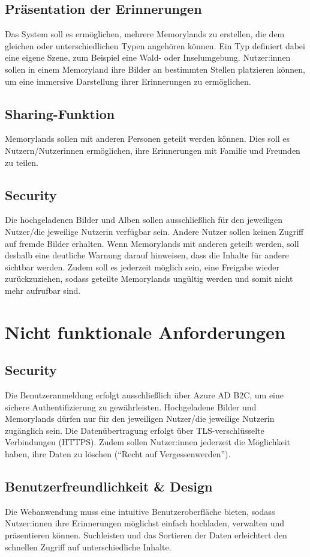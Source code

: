 \subsection{Präsentation der Erinnerungen}

Das System soll es ermöglichen, mehrere Memorylands zu erstellen, die dem 
gleichen oder unterschiedlichen Typen angehören können. Ein Typ definiert 
dabei eine eigene Szene, zum Beispiel eine Wald- oder Inselumgebung. Nutzer:innen sollen
in einem Memoryland ihre Bilder an bestimmten Stellen platzieren können, um 
eine immersive Darstellung ihrer Erinnerungen zu ermöglichen.

\subsection{Sharing-Funktion}

Memorylands sollen mit anderen Personen geteilt werden können. Dies soll es 
Nutzern/Nutzerinnen ermöglichen, ihre Erinnerungen mit Familie und Freunden zu teilen.

\subsection{Security}

Die hochgeladenen Bilder und Alben sollen ausschlie\ss{}lich für den jeweiligen Nutzer/die
jeweilige Nutzerin verfügbar sein. Andere Nutzer sollen keinen Zugriff auf fremde Bilder 
erhalten. Wenn Memorylands mit anderen geteilt werden, soll deshalb eine deutliche Warnung 
darauf hinweisen, dass die Inhalte für andere sichtbar werden. Zudem soll es jederzeit 
möglich sein, eine Freigabe wieder zurückzuziehen, sodass geteilte Memorylands ungültig 
werden und somit nicht mehr aufrufbar sind.

\section{Nicht funktionale Anforderungen}


\subsection{Security}

Die Benutzeranmeldung erfolgt ausschlie\ss{}lich über Azure AD B2C, um eine sichere 
Authentifizierung zu gewährleisten. Hochgeladene Bilder und Memorylands dürfen nur 
für den jeweiligen Nutzer/die jeweilige Nutzerin zugänglich sein. Die Datenübertragung 
erfolgt über TLS-verschlüsselte Verbindungen (HTTPS). Zudem sollen Nutzer:innen jederzeit 
die Möglichkeit haben, ihre Daten zu löschen (``Recht auf Vergessenwerden'').

\subsection{Benutzerfreundlichkeit \& Design}

Die Webanwendung muss eine intuitive Benutzeroberfläche bieten, sodass Nutzer:innen ihre 
Erinnerungen möglichst einfach hochladen, verwalten und präsentieren können. 
Suchleisten und das Sortieren der Daten erleichtert den schnellen Zugriff auf 
unterschiedliche Inhalte.
